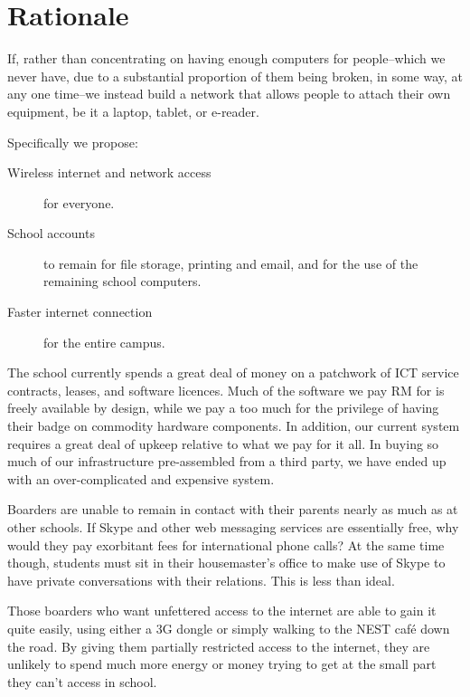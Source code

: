 \documentclass[a4paper,leqno,titlepage]{article}
\begin{document}
\break

\section{Rationale}


If, rather than concentrating on having enough computers for people--which we
never have, due to a substantial proportion of them being broken, in some way,
at any one time--we instead build a network that allows people to attach their
own equipment, be it a laptop, tablet, or e-reader.

Specifically we propose:
    
\begin{description}

\item[Wireless internet and network access] for everyone.
\item[School accounts] to remain for file storage, printing and email, and for
the use of the remaining school computers.
\item[Faster internet connection] for the entire campus.


\end{description}


The school currently spends a great deal of money on a patchwork of ICT
service contracts, leases, and software licences.
Much of the software we pay RM for is freely available by design, while we pay
a too much for the privilege of having their badge on commodity hardware components.
In addition, our current system requires a great deal of upkeep relative to
what we pay for it all. In buying so much of our infrastructure pre-assembled
from a third party, we have ended up with an over-complicated and
expensive system.


Boarders are unable to remain in contact with their parents nearly as much
as at other schools. If Skype and other web messaging services are essentially free, why
would they pay exorbitant fees for international phone calls? At the same time though, students
must sit in their housemaster's office to make use of Skype to have private conversations with their
relations. This is less than ideal.


Those boarders who want unfettered access to the internet are
able to gain it quite easily, using either a 3G dongle or simply walking to the NEST
café down the road. By giving them partially restricted access to the internet,
they are unlikely to spend much more energy or money trying to get at the small part
they can't access in school.
\end{document}

